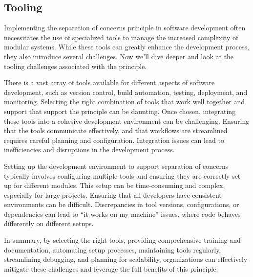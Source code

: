 \subsection{Tooling}
Implementing the separation of concerns principle in software development often necessitates the use of specialized tools to manage the increased complexity of modular systems. 
While these tools can greatly enhance the development process, they also introduce several challenges. 
Now we'll dive deeper and look at the tooling challenges associated with the principle.
\par
There is a vast array of tools available for different aspects of software development, such as version control, build automation, testing, deployment, and monitoring. 
Selecting the right combination of tools that work well together and support that support the principle can be daunting.
Once chosen, integrating these tools into a cohesive development environment can be challenging. 
Ensuring that the tools communicate effectively, and that workflows are streamlined requires careful planning and configuration. 
Integration issues can lead to inefficiencies and disruptions in the development process.
\par
Setting up the development environment to support separation of concerns typically involves configuring multiple tools and ensuring they are correctly set up for different modules. This setup can be time-consuming and complex, especially for large projects.
Ensuring that all developers have consistent environments can be difficult. Discrepancies in tool versions, configurations, or dependencies can lead to “it works on my machine” issues, where code behaves differently on different setups.
\par
In summary, by selecting the right tools, providing comprehensive training and documentation, automating setup processes, maintaining tools regularly, streamlining debugging, and planning for scalability, organizations can effectively mitigate these challenges and leverage the full benefits of this principle.


